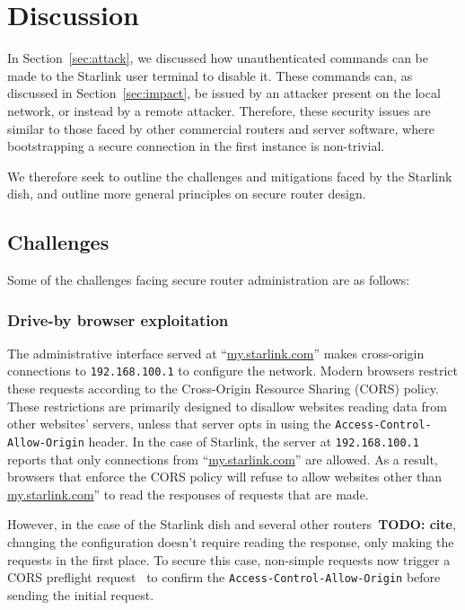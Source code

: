 \section{Discussion}\label{sec:discussion}

In Section~\ref{sec:attack}, we discussed how unauthenticated commands can be made to the Starlink user terminal to disable it.
These commands can, as discussed in Section~\ref{sec:impact}, be issued by an attacker present on the local network, or instead by a remote attacker.
Therefore, these security issues are similar to those faced by other commercial routers and server software, where bootstrapping a secure connection in the first instance is non-trivial.

We therefore seek to outline the challenges and mitigations faced by the Starlink dish, and outline more general principles on secure router design.

\subsection{Challenges}

Some of the challenges facing secure router administration are as follows:

\subsubsection{Drive-by browser exploitation}

The administrative interface served at ``\url{my.starlink.com}'' makes cross-origin connections to \texttt{192.168.100.1} to configure the network.
Modern browsers restrict these requests according to the Cross-Origin Resource Sharing (CORS) policy.
These restrictions are primarily designed to disallow websites reading data from other websites' servers, unless that server opts in using the \texttt{Access-Control-Allow-Origin} header.
In the case of Starlink, the server at \texttt{192.168.100.1} reports that only connections from ``\url{my.starlink.com}'' are allowed.
As a result, browsers that enforce the CORS policy will refuse to allow websites other than \url{my.starlink.com}'' to read the responses of requests that are made.

However, in the case of the Starlink dish and several other routers~\textbf{TODO: cite}, changing the configuration doesn't require reading the response, only making the requests in the first place.
To secure this case, non-simple requests now trigger a CORS preflight request~\cite{simple_requests, preflight_request} to confirm the \texttt{Access-Control-Allow-Origin} before sending the initial request.

